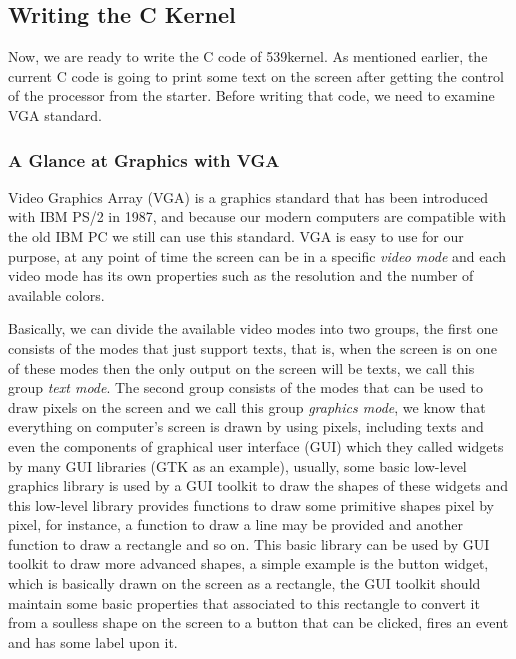 \subsection{Writing the C Kernel}\label{writing-the-c-kernel}

Now, we are ready to write the C code of 539kernel. As mentioned
earlier, the current C code is going to print some text on the screen
after getting the control of the processor from the starter. Before
writing that code, we need to examine VGA standard.

\subsubsection{A Glance at Graphics with
VGA}\label{a-glance-at-graphics-with-vga}

Video Graphics Array (VGA) is a graphics standard that has been
introduced with IBM PS/2 in 1987, and because our modern computers are
compatible with the old IBM PC we still can use this standard. VGA is
easy to use for our purpose, at any point of time the screen can be in a
specific \emph{video mode} and each video mode has its own properties
such as the resolution and the number of available colors.

Basically, we can divide the available video modes into two groups, the
first one consists of the modes that just support texts, that is, when
the screen is on one of these modes then the only output on the screen
will be texts, we call this group \emph{text mode}. The second group
consists of the modes that can be used to draw pixels on the screen and
we call this group \emph{graphics mode}, we know that everything on
computer's screen is drawn by using pixels, including texts and even the
components of graphical user interface (GUI) which they called widgets
by many GUI libraries (GTK as an example), usually, some basic low-level
graphics library is used by a GUI toolkit to draw the shapes of these
widgets and this low-level library provides functions to draw some
primitive shapes pixel by pixel, for instance, a function to draw a line
may be provided and another function to draw a rectangle and so on. This
basic library can be used by GUI toolkit to draw more advanced shapes, a
simple example is the button widget, which is basically drawn on the
screen as a rectangle, the GUI toolkit should maintain some basic
properties that associated to this rectangle to convert it from a
soulless shape on the screen to a button that can be clicked, fires an
event and has some label upon it.

